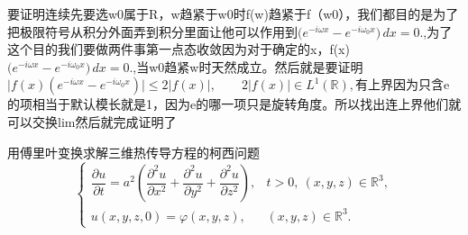 \begin{dxtips}
    要证明连续先要选w0属于R，w趋紧于w0时f(w)趋紧于f（w0），我们都目的是为了把极限符号从积分外面弄到积分里面让他可以作用到$\bigl(e^{-i\omega x}-e^{-i\omega_0 x}\bigr)\,dx
=0.$,为了这个目的我们要做两件事第一点态收敛因为对于确定的x，f(x)$\bigl(e^{-i\omega x}-e^{-i\omega_0 x}\bigr)\,dx
=0.$,当w0趋紧w时天然成立。然后就是要证明
$
\bigl|f(x)(e^{-i\omega x}-e^{-i\omega_0 x})\bigr|
\le 2|f(x)|,\qquad 2|f(x)|\in L^1(\mathbb R),
$有上界因为只含e的项相当于默认模长就是1，因为e的哪一项只是旋转角度。所以找出连上界他们就可以交换lim然后就完成证明了
\end{dxtips}
\begin{homework}[3]
用傅里叶变换求解三维热传导方程的柯西问题
\[
\begin{cases}
\dfrac{\partial u}{\partial t}
=a^2\left(
\dfrac{\partial^2 u}{\partial x^2}
+\dfrac{\partial^2 u}{\partial y^2}
+\dfrac{\partial^2 u}{\partial z^2}
\right),
& t>0,\ (x,y,z)\in\mathbb R^3,\\[6pt]
u(x,y,z,0)=\varphi(x,y,z),
& (x,y,z)\in\mathbb R^3.
\end{cases}
\]
\end{homework}

